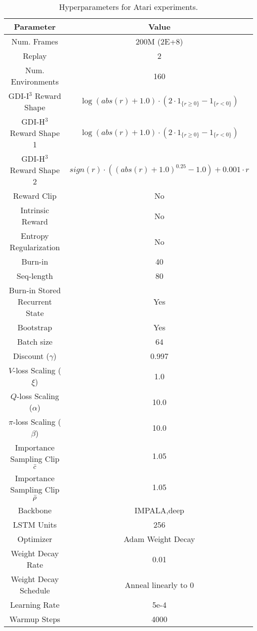 \begin{table}[H]
\begin{center}
\caption{Hyperparameters for Atari experiments.}
\label{tab:fixed_model_hyperparameters_atari}
\begin{tabular}{|c|c|}
\hline
\textbf{Parameter} & \textbf{Value}  \\
\hline
Num. Frames & 200M (2E+8) \\
\hline
Replay & 2 \\
\hline
Num. Environments & 160 \\
\hline
GDI-I$^3$ Reward Shape & $\log (abs (r) + 1.0) \cdot (2 \cdot 1_{\{r \geq 0\}} - 1_{\{r < 0\}})$ \\
\hline
GDI-H$^3$ Reward Shape 1 & $\log (abs (r) + 1.0) \cdot (2 \cdot 1_{\{r \geq 0\}} - 1_{\{r < 0\}})$ \\
\hline
GDI-H$^3$ Reward Shape 2 & $sign(r) \cdot ((abs (r) + 1.0)^{0.25} - 1.0) + 0.001 \cdot r$ \\
\hline
Reward Clip & No \\
\hline
Intrinsic Reward & No \\
\hline
Entropy Regularization & No \\
\hline
Burn-in & 40 \\
\hline
Seq-length & 80 \\
\hline
Burn-in Stored Recurrent State & Yes \\
\hline
Bootstrap & Yes \\
\hline
Batch size & 64 \\
\hline
Discount ($\gamma$) & 0.997 \\
\hline
$V$-loss Scaling ($\xi$) & 1.0 \\
\hline
$Q$-loss Scaling ($\alpha$) & 10.0 \\
\hline
$\pi$-loss Scaling ($\beta$) & 10.0 \\
\hline
Importance Sampling Clip $\Bar{c}$ & 1.05 \\
\hline
Importance Sampling Clip $\Bar{\rho}$ & 1.05 \\
\hline
Backbone & IMPALA,deep \\
\hline
LSTM Units & 256 \\
\hline
Optimizer & Adam Weight Decay \\
\hline
Weight Decay Rate & 0.01 \\
\hline
Weight Decay Schedule & Anneal linearly to 0 \\
\hline
Learning Rate & 5e-4 \\
\hline
Warmup Steps & 4000 \\

\end{tabular}
\end{center}
\end{table}
